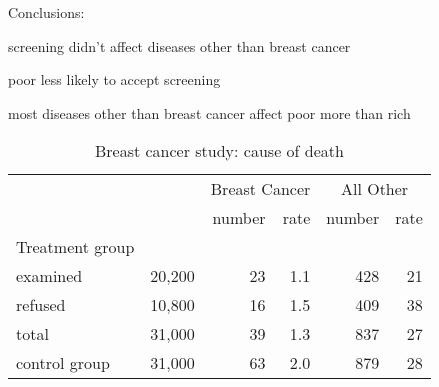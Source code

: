 \documentclass[landscape]{exam}
\begin{document}
  Conclusions:
  \begin{itemize*}
    \item screening didn't affect diseases other than breast cancer
    \item poor less likely to accept screening
    \item most diseases other than breast cancer affect poor more than rich
  \end{itemize*}

  \begin{table}
    \centering
    \begin{tabular}{lrrrrr}
      & & \multicolumn{2}{c}{Breast Cancer} & \multicolumn{2}{c}{All Other} \\
                               \cmidrule(r){3-4} \cmidrule(r){5-6}    
                      &        & number & rate & number & rate \\
      Treatment group \\
      examined        & 20,200 & 23     & 1.1  & 428    & 21 \\
      refused         & 10,800 & 16     & 1.5  & 409    & 38 \\
      total           & 31,000 & 39     & 1.3  & 837    & 27 \\
    \midrule
      control group   & 31,000 & 63     & 2.0  & 879    & 28 \\
    \end{tabular}
    \caption{Breast cancer study: cause of death}
    \label{tab:breast.cancer}
  \end{table}
\end{document}
